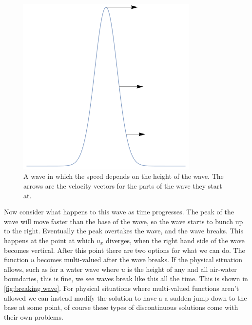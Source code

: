 \documentclass[fleqn]{NotesClass}
\begin{document}
    \begin{figure}
        \includegraphics[width=0.8\textwidth]{images/height-dependent-speed}
        \caption[height dependent speed]{A wave in which the speed depends on the height of the wave. The arrows are the velocity vectors for the parts of the wave they start at.}
        \label{fig:height dependent speed}
    \end{figure}
    
    Now consider what happens to this wave as time progresses.
    The peak of the wave will move faster than the base of the wave, so the wave starts to bunch up to the right.
    Eventually the peak overtakes the wave, and the wave breaks.
    This happens at the point at which \(u_x\) diverges, when the right hand side of the wave becomes vertical.
    After this point there are two options for what we can do.
    The function \(u\) becomes multi-valued after the wave breaks.
    If the physical situation allows, such as for a water wave where \(u\) is the height of any and all air-water boundaries, this is fine, we see waves break like this all the time.
    This is shown in \cref{fig:breaking wave}.
    For physical situations where multi-valued functions aren't allowed we can instead modify the solution to have a a sudden jump down to the base at some point, of course these types of discontinuous solutions come with their own problems.
    
\end{document}
